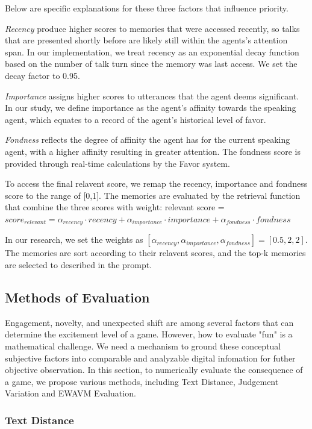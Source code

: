 Below are specific explanations for these three factors that influence priority.

\textit{Recency} produce higher scores to memories that were accessed recently, so talks that are presented shortly before are likely still within the agents's attention span. In our implementation, we treat recency as an exponential decay function based on the number of talk turn since the memory was last access. We set the decay factor to 0.95.

\textit{Importance} assigns higher scores to utterances that the agent deems significant. In our study, we define importance as the agent's affinity towards the speaking agent, which equates to a record of the agent’s historical level of favor.

\textit{Fondness} reflects the degree of affinity the agent has for the current speaking agent, with a higher affinity resulting in greater attention. The fondness score is provided through real-time calculations by the Favor system.

To access the final relavent score, we remap the recency, importance and fondness score to the range of [0,1]. The memories are evaluated by the retrieval function that combine the three scores with weight: relevant score = $ score_{relevant}=\alpha_{recency}\cdot recency+\alpha_{importance}\cdot importance+ \alpha_{fondness}\cdot fondness $

In our research, we set the weights as  $ [\alpha_{recency},\alpha_{importance},\alpha_{fondness}]=[0.5,2,2] $. The memories are sort according to their relavent scores, and the top-k memories are selected to described in the prompt. 

\subsection{Methods of Evaluation} \label{sec:Evaluation}

Engagement, novelty, and unexpected shift are among several factors that can determine the excitement level of a game. However, how to evaluate "fun" is a mathematical challenge. We need a mechanism to ground these conceptual subjective factors into comparable and analyzable digital infomation for futher objective observation. In this section, to numerically evaluate the consequence of a game, we propose various methods, including Text Distance, Judgement Variation and EWAVM Evaluation.

\subsubsection{Text Distance} \label{sec:Evaluation_TextDistance}

